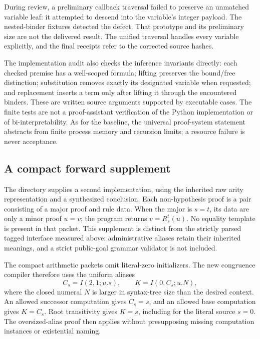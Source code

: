 \documentclass[11pt,letterpaper]{article}
\theoremstyle{definition}
\theoremstyle{remark}
\newcommand{\Rep}[3]{R_{#1}^{#2}(#3)}
\newcommand{\code}[1]{\texttt{\detokenize{#1}}}
\begin{document}
During review, a preliminary callback traversal failed to preserve an
unmatched variable leaf: it attempted to descend into the variable's
integer payload. The nested-binder fixtures detected the defect. That
prototype and its preliminary size are not the delivered result. The
unified traversal handles every variable explicitly, and the final
receipts refer to the corrected source hashes.

The implementation audit also checks the inference invariants directly:
each checked premise has a well-scoped formula; lifting preserves the
bound/free distinction; substitution removes exactly its designated
variable when requested; and replacement inserts a term only after
lifting it through the encountered binders. These are written source
arguments supported by executable cases. The finite tests are not a
proof-assistant verification of the Python implementation or of
bi-interpretability. As for the baseline, the universal proof-system
statement abstracts from finite process memory and recursion limits;
a resource failure is never acceptance.



\subsection{A compact forward supplement}
\label{supp:compact-forward}

The directory \code{compact/} supplies a second implementation, using the
inherited raw arity representation and a synthesized conclusion. Each
non-hypothesis proof is a pair consisting of a major proof and rule data.
When the major is $s=t$, its data are only a minor proof $u=v$; the program
returns $v=\Rep{s}{t}{u}$. No equality template is present in that packet.
This supplement is distinct from the strictly parsed tagged interface
measured above: administrative aliases retain their inherited meanings,
and a strict public-goal grammar validator is not included.

The compact arithmetic packets omit literal-zero initializers. The new
congruence compiler therefore uses the uniform aliases
\[
 C_s=I(2,1;u.s),\qquad K=I(0,C_s;u.N),
\]
where the closed numeral $N$ is larger in syntax-tree size than the desired
context. An allowed successor computation gives $C_s=s$, and an allowed
base computation gives $K=C_s$. Root transitivity gives $K=s$, including
for the literal source $s=0$. The oversized-alias proof then applies
without presupposing missing computation instances or existential naming.
\end{document}
